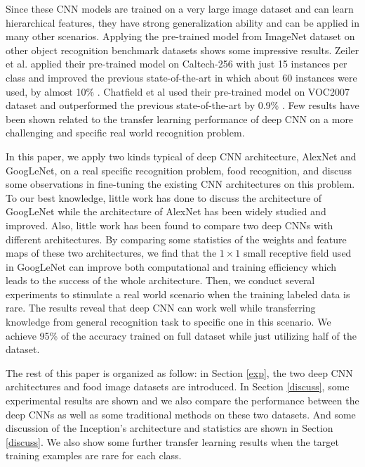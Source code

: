 Since these CNN models are trained on a very large image dataset and can learn hierarchical features, they have strong generalization ability and can be applied in many other scenarios. Applying the pre-trained model from ImageNet dataset on other object recognition benchmark datasets shows some impressive results.
Zeiler et al. applied their pre-trained model on Caltech-256 with just 15 instances per class and improved the previous state-of-the-art in which about 60 instances were used, by almost 10\% \cite{zeiler2014visualizing}.
Chatfield et al used their pre-trained model on VOC2007 dataset and outperformed the previous state-of-the-art by 0.9\% \cite{Chatfield14}.
Few results have been shown related to the transfer learning performance of deep CNN on a more challenging and specific real world recognition problem.

In this paper, we apply two kinds typical of deep CNN architecture, AlexNet and GoogLeNet, on a real specific recognition problem, food recognition, and discuss some observations in fine-tuning the existing CNN architectures on this problem. To our best knowledge, little work has done to discuss the architecture of GoogLeNet while the architecture of AlexNet has been widely studied and improved. Also, little work has been found to compare two deep CNNs with different architectures. By comparing some statistics of the weights and feature maps of these two architectures, we find that the $1\times 1$ small receptive field used in GoogLeNet can improve both computational and training efficiency which leads to the success of the whole architecture.
Then, we conduct several experiments to stimulate a real world scenario when the training labeled data is rare. The results reveal that deep CNN can work well while transferring knowledge from general recognition task to specific one in this scenario. We achieve 95\% of the accuracy trained on full dataset while just utilizing half of the dataset.

The rest of this paper is organized as follow: in Section \ref{exp}, the two deep CNN architectures and food image datasets are introduced. In Section \ref{discuss}, some experimental results are shown and we also compare the performance between the deep CNNs as well as some traditional methods on these two datasets. And some discussion of the Inception's architecture and statistics are shown in Section \ref{discuss}. We also show some further transfer learning results when the target training examples are rare for each class.
